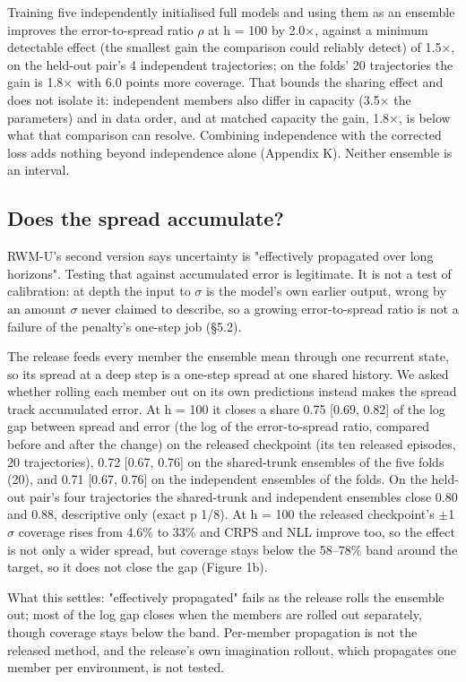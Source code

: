 \documentclass[10pt]{article}
\begin{document}
Training five independently initialised full models and using them as an ensemble improves the error-to-spread ratio $\rho$ at h = 100 by 2.0$\times$, against a minimum detectable effect (the smallest gain the comparison could reliably detect) of 1.5$\times$, on the held-out pair's 4 independent trajectories; on the folds' 20 trajectories the gain is 1.8$\times$ with 6.0 points more coverage. That bounds the sharing effect and does not isolate it: independent members also differ in capacity (3.5$\times$ the parameters) and in data order, and at matched capacity the gain, 1.8$\times$, is below what that comparison can resolve. Combining independence with the corrected loss adds nothing beyond independence alone (Appendix K). Neither ensemble is an interval.

\subsection{Does the spread accumulate?}

RWM-U's second version says uncertainty is "effectively propagated over long horizons". Testing that against accumulated error is legitimate. It is not a test of calibration: at depth the input to $\sigma$ is the model's own earlier output, wrong by an amount $\sigma$ never claimed to describe, so a growing error-to-spread ratio is not a failure of the penalty's one-step job (\S{}5.2).

The release feeds every member the ensemble mean through one recurrent state, so its spread at a deep step is a one-step spread at one shared history. We asked whether rolling each member out on its own predictions instead makes the spread track accumulated error. At h = 100 it closes a share 0.75 [0.69, 0.82] of the log gap between spread and error (the log of the error-to-spread ratio, compared before and after the change) on the released checkpoint (its ten released episodes, 20 trajectories), 0.72 [0.67, 0.76] on the shared-trunk ensembles of the five folds (20), and 0.71 [0.67, 0.76] on the independent ensembles of the folds. On the held-out pair's four trajectories the shared-trunk and independent ensembles close 0.80 and 0.88, descriptive only (exact p 1/8). At h = 100 the released checkpoint's $\pm$1$\sigma$ coverage rises from 4.6\% to 33\% and CRPS and NLL improve too, so the effect is not only a wider spread, but coverage stays below the 58--78\% band around the target, so it does not close the gap (Figure 1b).

What this settles: "effectively propagated" fails as the release rolls the ensemble out; most of the log gap closes when the members are rolled out separately, though coverage stays below the band. Per-member propagation is not the released method, and the release's own imagination rollout, which propagates one member per environment, is not tested.
\end{document}
